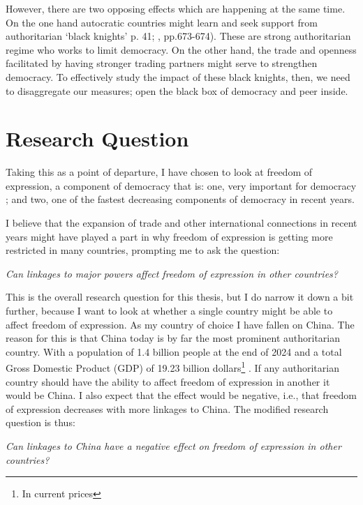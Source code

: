 However, there are two opposing effects which are happening at the same time. On the one hand autocratic countries might learn and seek support from authoritarian `black knights' \citeauthor{levitsky_competitive_2010} p. 41; \citeauthor{tolstrup_black_2014} \citeyear{tolstrup_black_2014}, pp.673-674). These are strong authoritarian regime who works to limit democracy. On the other hand, the trade and openness facilitated by having stronger trading partners might serve to strengthen democracy. To effectively study the impact of these black knights, then, we need to disaggregate our measures; open the black box of democracy and peer inside. 

\section{Research Question}
Taking this as a point of departure, I have chosen to look at freedom of expression, a component of democracy that is: one, very important for democracy \citep{dahl_polyarchy_1971, dahl_democracy_1989}; and two, one of the fastest decreasing components of democracy in recent years\citep{nord_democracy_2025}.

I believe that the expansion of trade and other international connections in recent years might have played a part in why freedom of expression is getting more restricted in many countries, prompting me to ask the question:
\begin{displayquote}
    \textit{Can linkages to major powers affect freedom of expression in other countries?}
    \label{rq:general}
\end{displayquote}
This is the overall research question for this thesis, but I do narrow it down a bit further, because I want to look at whether a single country might be able to affect freedom of expression. As my country of choice I have fallen on China. The reason for this is that China today is by far the most prominent authoritarian country. With a population of 1.4 billion people at the end of 2024 \citep{guojia_tongjiju_national_bureau_of_statistics_zong_2024} and a total Gross Domestic Product (GDP) of 19.23 billion dollars\footnote{In current prices} \citep{imf_gdp_2025}. If any authoritarian country should have the ability to affect freedom of expression in another it would be China. I also expect that the effect would be negative, i.e., that freedom of expression decreases with more linkages to China. The modified research question is thus:
\begin{displayquote}
    \textit{Can linkages to China have a negative effect on freedom of expression in other countries?}
    \label{rq:specific}
\end{displayquote}


